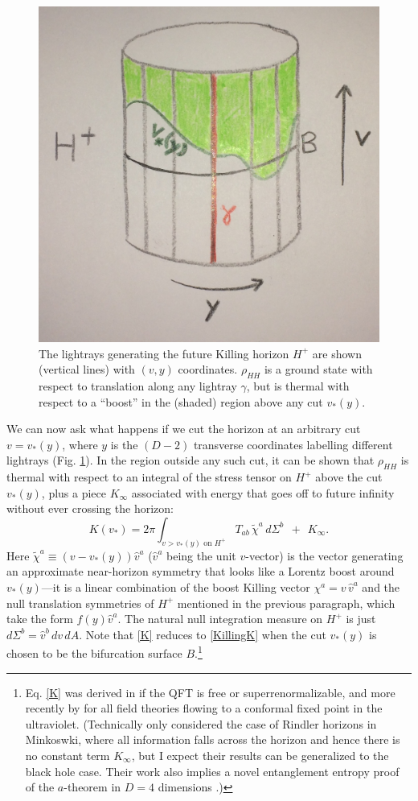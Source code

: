 \documentclass[12pt]{article}
\def\be{\begin{equation}}
\def\ee{\end{equation}}
\begin{document}
\begin{figure}[ht]
\centering
\includegraphics[width=.6\textwidth]{raycut.jpg}
\caption{\small The lightrays generating the future Killing horizon $H^+$ are shown (vertical lines) with $(v,y)$ coordinates.  $\rho_{HH}$ is a ground state with respect to translation along any lightray $\gamma$, but is thermal with respect to a ``boost'' in the (shaded) region above any cut $v_*(y)$.}\label{fig:raycut}
\end{figure}

We can now ask what happens if we cut the horizon at an arbitrary cut $v = v_*(y)$, where $y$ is the $(D-2)$ transverse coordinates labelling different lightrays (Fig. \ref{fig:raycut}).  In the region outside any such cut, it can be shown that $\rho_{HH}$ is thermal with respect to an integral of the stress tensor on $H^+$ above the cut $v_*(y)$, plus a piece $K_\infty$ associated with energy that goes off to future infinity without ever crossing the horizon:
\be\label{K}
K(v_*) = 2\pi \int_{v > v_*(y) \text{ on } H^+}\!\!\!\!\!\!\! \!\!\!\!\!\!\! \!\!\!\!\!\!\! \!\!\!
T_{ab}\,\widetilde{\chi}^a\,d\Sigma^b \:\:+\:\: K_\infty.
\ee
Here $\widetilde{\chi}^a \equiv (v - v_*(y))\hat{v}^a$ ($\hat{v}^a$ being the unit $v$-vector) is the vector generating an approximate near-horizon symmetry that looks like a Lorentz boost around $v_*(y)$---it is a linear combination of the boost Killing vector $\chi^a = v\,\hat{v}^a$ and the null translation symmetries of $H^+$ mentioned in the previous paragraph, which take the form $f(y) \hat{v}^a$.  The natural null integration measure on $H^+$ is just $d\Sigma^b = \hat{v}^b\,dv\,dA$.  Note that \eqref{K} reduces to \eqref{KillingK} when the cut $v_*(y)$ is chosen to be the bifurcation surface $B$.\footnote{Eq. \eqref{K} was derived in \cite{wall2011} if the QFT is free or superrenormalizable, and more recently by \cite{Casini:2017roe} for all field theories flowing to a conformal fixed point in the ultraviolet. (Technically \cite{Casini:2017roe} only considered the case of Rindler horizons in Minkoswki, where all information falls across the horizon and hence there is no constant term $K_\infty$, but I expect their results can be generalized to the black hole case.  Their work also implies a novel entanglement entropy proof of the $a$-theorem in $D = 4$ dimensions \cite{Casini:2017vbe}.)}
\end{document}
